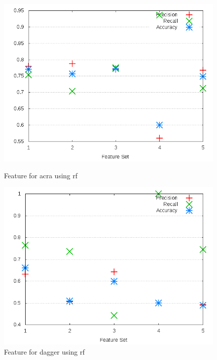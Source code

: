 \begin{figure}[h]
    \centering

    \begin{minipage}[b]{0.45\linewidth}
        \includegraphics[width=1.0\textwidth]{images/rf/test_3/acra_sample_range}
        \caption{Feature for acra using \gls{rf}}
        \label{fig:test_3_acra_rf}
    \end{minipage}
\quad
    \begin{minipage}[b]{0.45\linewidth}
        \includegraphics[width=1.0\textwidth]{images/rf/test_3/dagger_sample_range}
        \caption{Feature for dagger using \gls{rf}}
        \label{fig:test_3_dagger_rf}
    \end{minipage}
\end{figure}

